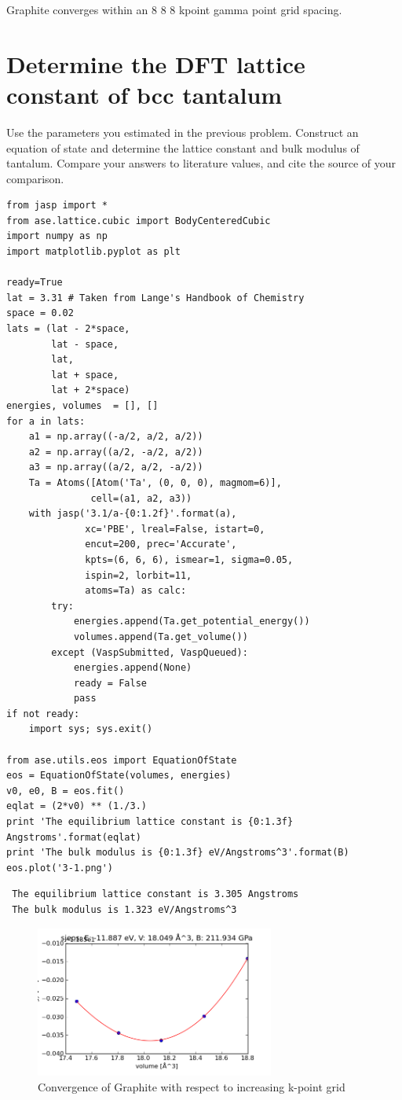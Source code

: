 \documentclass[11pt]{article}
\begin{document}
Graphite converges within an 8 \texttimes{} 8 \texttimes{} 8 kpoint gamma point grid spacing.
\section{Determine the DFT lattice constant of bcc tantalum}
\label{sec-3}

  Use the parameters you estimated in the previous problem. Construct an equation of state and determine the lattice constant and bulk modulus of tantalum. Compare your answers to literature values, and cite the source of your comparison.


\begin{verbatim}
from jasp import *
from ase.lattice.cubic import BodyCenteredCubic
import numpy as np
import matplotlib.pyplot as plt

ready=True
lat = 3.31 # Taken from Lange's Handbook of Chemistry 
space = 0.02
lats = (lat - 2*space,
        lat - space,
        lat,
        lat + space,
        lat + 2*space)
energies, volumes  = [], []
for a in lats:
    a1 = np.array((-a/2, a/2, a/2))
    a2 = np.array((a/2, -a/2, a/2))
    a3 = np.array((a/2, a/2, -a/2))
    Ta = Atoms([Atom('Ta', (0, 0, 0), magmom=6)],
               cell=(a1, a2, a3))
    with jasp('3.1/a-{0:1.2f}'.format(a),
              xc='PBE', lreal=False, istart=0,
              encut=200, prec='Accurate',
              kpts=(6, 6, 6), ismear=1, sigma=0.05,
              ispin=2, lorbit=11,
              atoms=Ta) as calc:
        try:
            energies.append(Ta.get_potential_energy())
            volumes.append(Ta.get_volume())
        except (VaspSubmitted, VaspQueued):
            energies.append(None)
            ready = False
            pass
if not ready:
    import sys; sys.exit()

from ase.utils.eos import EquationOfState
eos = EquationOfState(volumes, energies)
v0, e0, B = eos.fit()
eqlat = (2*v0) ** (1./3.)
print 'The equilibrium lattice constant is {0:1.3f} Angstroms'.format(eqlat)
print 'The bulk modulus is {0:1.3f} eV/Angstroms^3'.format(B)
eos.plot('3-1.png')
\end{verbatim}

\begin{verbatim}
 The equilibrium lattice constant is 3.305 Angstroms
 The bulk modulus is 1.323 eV/Angstroms^3
\end{verbatim}

\begin{figure}[H]
\centering
\includegraphics[width=0.7\textwidth]{./3-1.png}
\caption{Convergence of Graphite with respect to increasing k-point grid}
\end{figure}
\end{document}
